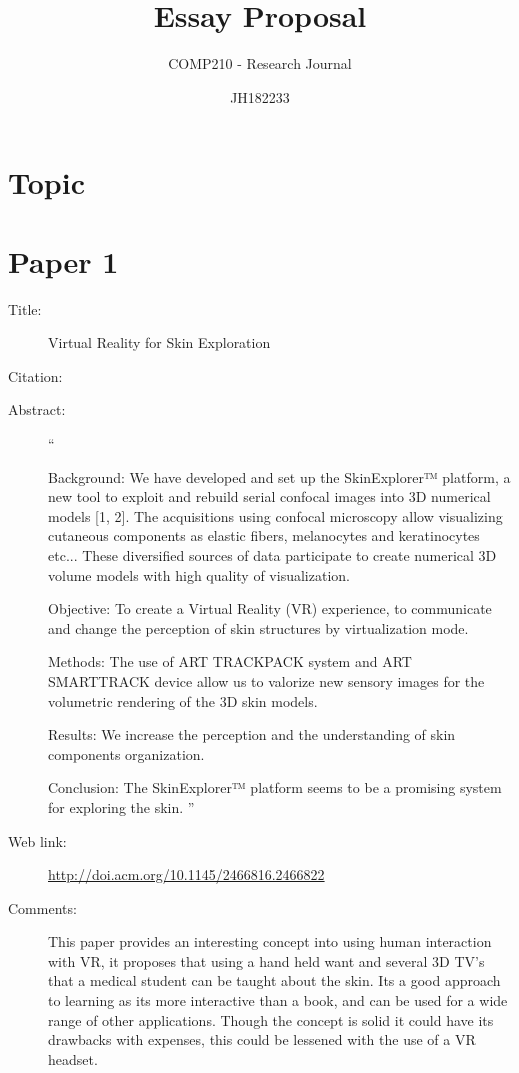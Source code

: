 \documentclass{scrartcl}
\title{Essay Proposal}
\subtitle{COMP210 - Research Journal}
\author{JH182233}
\begin{document}
	
	
	\maketitle
	\section*{Topic}
	
	
	\section*{Paper 1}
	\begin{description}
		\item[Title:] Virtual Reality for Skin Exploration
		\item[Citation:] \cite{Vazquez}
		\item[Abstract:] ``
		
		Background: We have developed and set up the SkinExplorer™ platform, a new tool to exploit and rebuild serial confocal images into 3D numerical models [1, 2]. The acquisitions using confocal microscopy allow visualizing cutaneous components as elastic fibers, melanocytes and keratinocytes etc... These diversified sources of data participate to create numerical 3D volume models with high quality of visualization.
		
		Objective: To create a Virtual Reality (VR) experience, to communicate and change the perception of skin structures by virtualization mode.
		
		Methods: The use of ART TRACKPACK system and ART SMARTTRACK device allow us to valorize new sensory images for the volumetric rendering of the 3D skin models.
		
		Results: We increase the perception and the understanding of skin components organization.
		
		Conclusion: The SkinExplorer™ platform seems to be a promising system for exploring the skin.
		''
		\item[Web link:] \url{http://doi.acm.org/10.1145/2466816.2466822}
		\item[Comments:] This paper provides an interesting concept into using human interaction with VR, it proposes that using a hand held want and several 3D TV's that a medical student can be taught about the skin. Its a good approach to learning as its more interactive than a book, and can be used for a wide range of other applications. Though the concept is solid it could have its drawbacks with expenses, this could be lessened with the use of a VR headset. 
	\end{description}
	
\end{document}
